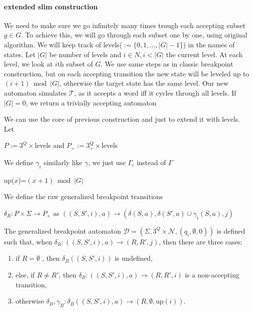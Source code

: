 \documentclass[
	digital
nolof, nolot
]{fithesis3}
\newcommand{\cD}{\mathcal{D}}
\newcommand{\cN}{\mathcal{N}}
\newcommand{\cT}{\mathcal{T}}
\begin{document}
			\paragraph{extended slim construction}
			We need to make sure we go infinitely many times trough each accepting subset $g \in G$. To achieve this, we will go through each subset one by one, using original algorithm. We will keep track of levels($:=\{0,1,\ldots,|G|-1\}$) in the names of states. Let $|G|$ be number of levels and $i \in N, i<|G|$ the current level. At each level, we look at $i$th subset of $G$. We use same steps as in classic breakpoint construction, but on each accepting transition the new state will be leveled up to $(i+1)\bmod|G|$, otherwise the target state has the same level. Our new automaton simulates $\cT$, as it accepts a word iff it cycles through all levels. If $|G|=0$, we return a trivially accepting automaton
			
			We can use the core of previous construction and just to extend it with levels. Let
			
			
			
			$P := 3^Q \times $levels and $P_+ := 3^Q_+ \times $levels
			
			
			We define $\gamma_i$ similarly like $\gamma$, we just use $\Gamma_i$ instead of $\Gamma$
			
			up($x$)=$(x+1)\bmod|G|$
			
			We define the raw generalized breakpoint transitions 
			
			$\delta_R:P \times \Sigma \rightarrow P_+$ as
			$((S, S', i), a) \rightarrow(\delta(S, a), \delta(S',a)\cup \gamma_{i}(S, a), j)$
			
			The generalized breakpoint automaton $\cD=(\Sigma, 3^Q\times\cN, ({q_i},\emptyset, 0))$ is defined such that, when $\delta_R:((S, S', i), a) \rightarrow (R, R', j)$, then there are three cases:
			\begin{enumerate}
				\item if $R=\emptyset$ , then $\delta_B((S,S',i))$ is undefined,
				\item else, if $R \neq R'$, then $\delta_B:((S,S',i),a) \rightarrow (R,R',i)$ is a non-accepting transition,
				\item otherwise $\delta_B, \gamma_B: \delta_B((S,S',i),a)\rightarrow(R, \emptyset, \text{up}(i))$.
			\end{enumerate}
		
\end{document}
